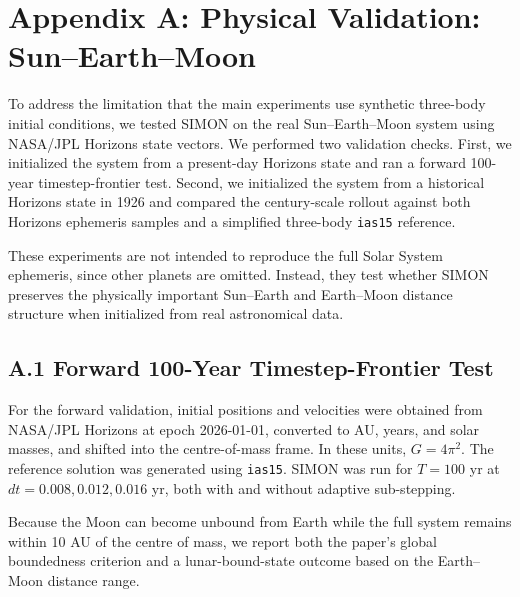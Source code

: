 \documentclass[12pt]{article}
\begin{document}

\clearpage
{}
\section*{Appendix A: Physical Validation: Sun--Earth--Moon}
\label{app:real_system_validation}

To address the limitation that the main experiments use synthetic three-body initial
conditions, we tested SIMON on the real Sun--Earth--Moon system using NASA/JPL
Horizons state vectors. We performed two validation checks. First, we initialized the
system from a present-day Horizons state and ran a forward 100-year timestep-frontier
test. Second, we initialized the system from a historical Horizons state in 1926 and
compared the century-scale rollout against both Horizons ephemeris samples and a
simplified three-body \texttt{ias15} reference.

These experiments are not intended to reproduce the full Solar System ephemeris, since
other planets are omitted. Instead, they test whether SIMON preserves the physically
important Sun--Earth and Earth--Moon distance structure when initialized from real
astronomical data.

\subsection*{A.1 Forward 100-Year Timestep-Frontier Test}

For the forward validation, initial positions and velocities were obtained from NASA/JPL
Horizons at epoch 2026-01-01, converted to AU, years, and solar masses, and shifted into
the centre-of-mass frame. In these units, \(G = 4\pi^2\). The reference solution was
generated using \texttt{ias15}. SIMON was run for \(T = 100\) yr at
\(dt = 0.008, 0.012, 0.016\) yr, both with and without adaptive sub-stepping.

Because the Moon can become unbound from Earth while the full system remains within
10 AU of the centre of mass, we report both the paper's global boundedness criterion
and a lunar-bound-state outcome based on the Earth--Moon distance range.
\end{document}
